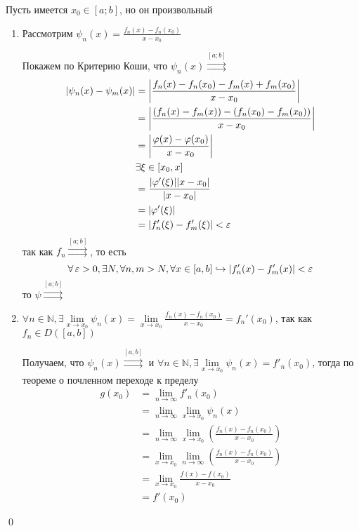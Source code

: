 \documentclass[a4paper]{article}
\begin{document}
Пусть имеется $x_0\in[a;b]$, но он произвольный
\begin{enumerate}
    \item Рассмотрим $\psi_n(x)=\displaystyle\frac{f_n(x)-f_n(x_0)}{x-x_0}$
    
    Покажем по Критерию Коши, что $\psi_n(x)\overset{[a;b]}{\rightrightarrows}$
    \begin{equation*}
        \begin{aligned}
            |\psi_n(x)-\psi_m(x)|&=\left|\frac{f_n(x)-f_n(x_0)-f_m(x)+f_m(x_0)}{x-x_0}\right|\\
            &=\left|\frac{(f_n(x)-f_m(x))-(f_n(x_0)-f_m(x_0))}{x-x_0}\right|\\
            &=\left|\frac{\varphi(x)-\varphi(x_0)}{x-x_0}\right|\\
            &\exists\xi\in[x_0, x]\\
            &=\frac{|\varphi'(\xi)||x-x_0|}{|x-x_0|}\\
            &=|\varphi'(\xi)|\\
            &=|f_n'(\xi)-f'_m(\xi)|<\operatorname{\varepsilon}
        \end{aligned}
    \end{equation*}
    так как $f_n\overset{[a;b]}{\rightrightarrows}$, то есть 
    \begin{equation*}
        \forall\operatorname{\varepsilon}>0,\exists N,\forall n,m>N,\forall x\in[a,b]\hookrightarrow|f_n'(x)-f'_m(x)|<\operatorname{\varepsilon}
    \end{equation*}
    то $\psi\overset{[a;b]}{\rightrightarrows}$

    \item $\forall n\in\mathbb{N},\exists\lim\limits_{x\to x_0}\psi_n(x)=\lim\limits_{x\to x_0}\displaystyle\frac{f_n(x)-f_n(x_0)}{x-x_0}=f_n'(x_0)$, так как $f_n\in D([a,b])$
    
    Получаем, что $\psi_n(x)\overset{[a, b]}{\rightrightarrows}$ и $\forall n\in\mathbb{N},\exists\lim\limits_{x\to x_0}\psi_n(x)=f'_n(x_0)$, тогда по теореме о почленном переходе к пределу
    \begin{equation*}
        \begin{aligned}
            g(x_0)&=\lim_{n\to\infty}f'_n(x_0)\\
            &=\lim_{n\to\infty}\lim_{x\to x_0}\psi_n(x)\\
            &=\lim_{n\to\infty}\lim_{x\to x_0}\left(\frac{f_n(x)-f_n(x_0)}{x-x_0}\right)\\
            &=\lim_{x\to x_0}\lim_{n\to\infty}\left(\frac{f_n(x)-f_n(x_0)}{x-x_0}\right)\\
            &=\lim_{x\to x_0}\frac{f(x)-f(x_0)}{x-x_0}\\
            &=f'(x_0)
        \end{aligned}
    \end{equation*}
\end{enumerate}\qed
\end{document}

